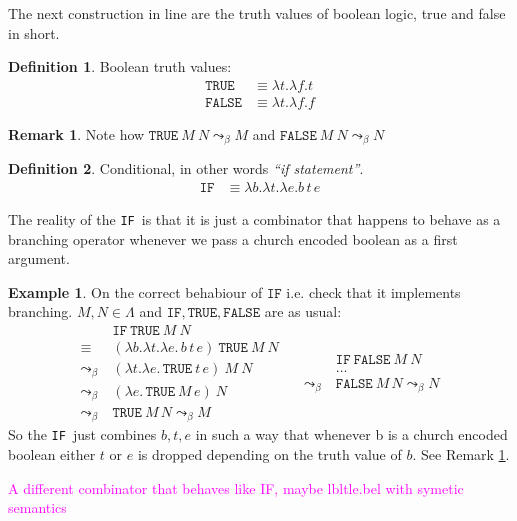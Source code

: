 \documentclass[12pt]{book}
\newcommand{\la}{\lambda}
\newcommand{\La}{\Lambda}
\newcommand{\IF}{\texttt{IF}}
\newcommand{\TRUE}{\texttt{TRUE}}
\newcommand{\FALSE}{\texttt{FALSE}}
\newcommand{\magenta}[1]{\textcolor{magenta}{#1}}
\newcommand{\curly}{\mathrel{\leadsto}_\beta}
\theoremstyle{plain}
\theoremstyle{definition}
\newtheorem{definition}{Definition}[section]
\theoremstyle{definition}
\newtheorem{example}{Example}[section]
\theoremstyle{definition}
\newtheorem{remark}{Remark}
\begin{document}
The next construction in line are the truth values of boolean logic, true and false in short.
\begin{definition} Boolean truth values:
\begin{align*}
\texttt{TRUE} &\equiv \lambda t.\lambda f. t \\
\texttt{FALSE} &\equiv \lambda t.\lambda f. f
\end{align*}
\end{definition}
\begin{remark}
  \label{rem:true-false}
  Note how $\TRUE \ M \ N \curly M $ and $ \FALSE \ M \ N \curly N $
\end{remark}
\begin{definition} Conditional, in other words \textit{``if statement''}.
\begin{align*}
\texttt{IF} &\equiv \lambda b.\lambda t.\lambda e. b\,t\,e
\end{align*}
\end{definition}
The reality of the \IF \ is that it is just a combinator that happens to behave as a branching operator whenever we pass a church encoded boolean as a first argument.
\begin{example} On the correct behabiour of $\IF$ i.e. check that it implements branching. $ M, N \in \La $ and $ \IF, \TRUE, \FALSE$ are as usual:
  \[
    \begin{aligned}
      & \IF \ \TRUE \ M \ N \\
      \equiv \ & (\la b.\la t.\la e.\, b\, t\, e) \ \TRUE \ M \ N  \\
      \curly \ & (\la t.\la e.\, \TRUE\ t\, e) \ M \ N  \\
      \curly \ & (\la e.\, \TRUE\ M\, e) \ N  \\
      \curly \ & \TRUE\ M\, N \curly M 
    \end{aligned}
    \quad
    \begin{aligned}
      & \IF \ \FALSE \ M \ N \\
      & \ldots \\
      \curly \ & \FALSE\ M\, N \curly N
    \end{aligned}
  \]
  So the \IF \ just combines $b, t, e$ in such a way that whenever b is a church encoded boolean either $t$ or $e$ is dropped depending on the truth value of $b$. See Remark \ref{rem:true-false}.
\end{example}

\magenta{A different combinator that behaves like IF, maybe lbltle.bel with symetic semantics}
\end{document}
